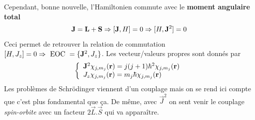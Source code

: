 Cependant, bonne nouvelle, l'Hamiltonien commute avec le \textbf{moment angulaire total}
\begin{equation}
{\bf J} = {\bf L} + {\bf S} \Rightarrow [ {\bf J}, H ] = 0
\Rightarrow [H, {\bf J}^2] = 0
\end{equation}
Ceci permet de retrouver la relation de commutation $[ H , J_z ] = 0 \Rightarrow ~\mbox{EOC}~ = \{
{\bf J}^2, J_z \}$. Les vecteur/valeurs propres sont donnés par 
\begin{equation}
 \left\{ \begin{array}{l}
{\bf J}^2 \chi_{j,m_j} ({\bf r}) = j(j+1) \hbar^2 \chi_{j,m_j} ({\bf r}) \\
J_z \chi_{j,m_j} ({\bf r}) = m_j \hbar \chi_{j,m_j} ({\bf r}) 
\end{array} \right.
\end{equation}
Les problèmes de Schrödinger viennent d'un couplage mais on se rend ici compte que c'est plus 
fondamental que ça. De même, avec $\vec{J}^2$ on sent venir le couplage \textit{spin-orbite} avec
un facteur $2\vec{L}.\vec{S}$ qui va apparaître.\\

